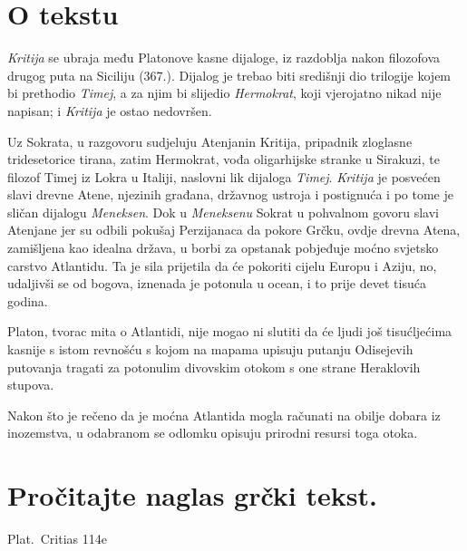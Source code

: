 


\section*{O tekstu}

\textit{Kritija} se ubraja među Platonove kasne dijaloge, iz razdoblja nakon filozofova drugog puta na Siciliju (367.). Dijalog je trebao biti središnji dio trilogije kojem bi prethodio \textit{Timej}, a za njim bi slijedio \textit{Hermokrat}, koji vjerojatno nikad nije napisan; i \textit{Kritija} je ostao nedovršen. 

Uz Sokrata, u razgovoru sudjeluju Atenjanin Kritija, pripadnik zloglasne tridesetorice tirana, zatim Hermokrat, vođa oligarhijske stranke u Sirakuzi, te filozof Timej iz Lokra u Italiji, naslovni lik dijaloga \textit{Timej}.  \textit{Kritija} je posvećen slavi drevne Atene, njezinih građana, državnog ustroja i postignuća i po tome je sličan dijalogu \textit{Meneksen}. Dok u \textit{Meneksenu} Sokrat u pohvalnom govoru slavi Atenjane jer su odbili pokušaj Perzijanaca da pokore Grčku, ovdje drevna Atena, zamišljena kao idealna država, u borbi za opstanak pobjeđuje moćno svjetsko carstvo Atlantidu. Ta je sila prijetila da će pokoriti cijelu Europu i Aziju, no, udaljivši se od bogova, iznenada je potonula u ocean, i to prije devet tisuća godina. 

Platon, tvorac mita o Atlantidi, nije mogao ni slutiti da će ljudi još tisućljećima kasnije s istom revnošću s kojom na mapama upisuju putanju Odisejevih putovanja tragati za potonulim divovskim otokom s one strane Heraklovih stupova. 

Nakon što je rečeno da je moćna Atlantida mogla računati na obilje dobara iz inozemstva, u odabranom se odlomku opisuju prirodni resursi toga otoka.

\newpage

\section*{Pročitajte naglas grčki tekst.}


Plat.\ Critias 114e

\medskip

